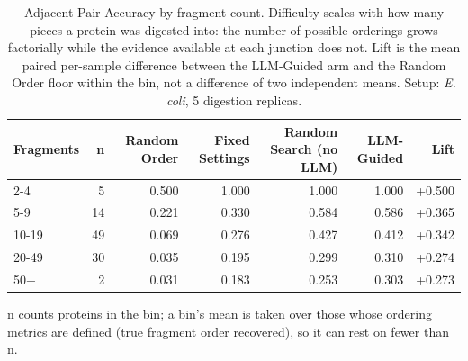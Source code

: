 \begin{table}[!tb]
  \centering
  \caption{Adjacent Pair Accuracy by fragment count. Difficulty scales with how many pieces a protein was digested into: the number of possible orderings grows factorially while the evidence available at each junction does not. Lift is the mean paired per-sample difference between the LLM-Guided arm and the Random Order floor within the bin, not a difference of two independent means. Setup: \textnormal{\textnormal{\textit{E. coli}}}, 5 digestion replicas.}
  \label{tab:stratification_ecoli_r5}
  \begin{tabular}{lrrrrrr}
    \toprule
    Fragments & n & Random Order & Fixed Settings & Random Search (no LLM) & LLM-Guided & Lift \\
    \midrule
    2-4 & 5 & 0.500 & 1.000 & 1.000 & 1.000 & +0.500 \\
    5-9 & 14 & 0.221 & 0.330 & 0.584 & 0.586 & +0.365 \\
    10-19 & 49 & 0.069 & 0.276 & 0.427 & 0.412 & +0.342 \\
    20-49 & 30 & 0.035 & 0.195 & 0.299 & 0.310 & +0.274 \\
    50+ & 2 & 0.031 & 0.183 & 0.253 & 0.303 & +0.273 \\
    \bottomrule
  \end{tabular}
  \par\smallskip\footnotesize{n counts proteins in the bin; a bin's mean is taken over those whose ordering metrics are defined (true fragment order recovered), so it can rest on fewer than n.}
\end{table}
